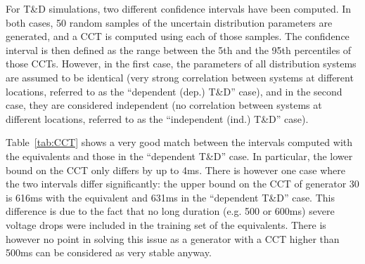 
For T\&D simulations, two different confidence intervals have been computed. In both cases, 50 random samples of the uncertain distribution parameters are generated, and a CCT is computed using each of those samples. The confidence interval is then defined as the range between the 5th and the 95th percentiles of those CCTs. However, in the first case, the parameters of all distribution systems are assumed to be identical (very strong correlation between systems at different locations, referred to as the ``dependent (dep.) T\&D'' case), and in the second case, they are considered independent (no correlation between systems at different locations, referred to as the ``independent (ind.) T\&D'' case).

Table~\ref{tab:CCT} shows a very good match between the intervals computed with the equivalents and those in the ``dependent T\&D'' case. In particular, the lower bound on the CCT only differs by up to 4ms. There is however one case where the two intervals differ significantly: the upper bound on the CCT of generator 30 is 616ms with the equivalent and 631ms in the ``dependent T\&D'' case. This difference is due to the fact that no long duration (e.g. 500 or 600ms) severe voltage drops were included in the training set of the equivalents. There is however no point in solving this issue as a generator with a CCT higher than 500ms can be considered as very stable anyway.

